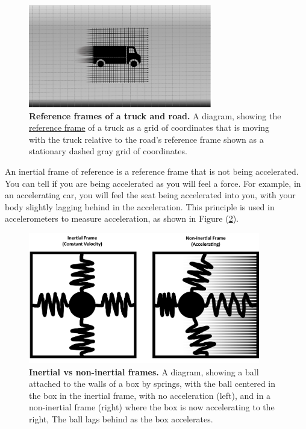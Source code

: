 \begin{figure}[H]
	\centering
	\includegraphics[width = 8cm]{images/pdf/Reference_Frames_of_truck_and_road.pdf}
	\caption{\textbf{Reference frames of a truck and road.} A diagram, showing the \protect\hyperlink{def-Reference-frame}{reference frame} of a truck as a grid of coordinates that is moving with the truck relative to the road's reference frame shown as a stationary dashed gray grid of coordinates.}
	\label{fig: Reference Frames}
\end{figure}

An inertial frame of reference is a reference frame that is not being accelerated.
You can tell if you are being accelerated as you will feel a force.
For example, in an accelerating car, you will feel the seat being accelerated into you, with your body slightly lagging behind in the acceleration.
This principle is used in accelerometers to measure acceleration, as shown in Figure (\ref{fig: spring boxes}).

\begin{figure}[H]
	\centering
	\includegraphics[width = 0.9\textwidth]{images/pdf/Spring_boxes.pdf}
	\caption{\textbf{Inertial vs non-inertial frames.} A diagram, showing a ball attached to the walls of a box by springs, with the ball centered in the box in the inertial frame, with no acceleration (left), and in a non-inertial frame (right) where the box is now accelerating to the right, The ball lags behind as the box accelerates.}
	\label{fig: spring boxes}
\end{figure}

